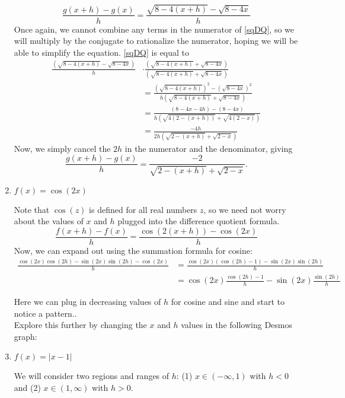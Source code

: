\documentclass{ximera}
\begin{document}
\begin{example}
\begin{enumerate}
\begin{explanation}
  \begin{equation}\label{sqDQ}
   \frac{g(x+h) - g(x)}{h} = \frac{\sqrt{8-4(x+h)} - \sqrt{8-4x}}{h}
  \end{equation}
  Once again, we cannot combine any terms in the numerator of \eqref{sqDQ}, so we will multiply by the conjugate to rationalize the numerator, hoping we will be able to simplify the equation. \eqref{sqDQ} is equal to
  \begin{align*}
 \frac{(\sqrt{8-4(x+h)} - \sqrt{8-4x})}{h} &\cdot \frac{(\sqrt{8-4(x+h)} + \sqrt{8-4x})}{(\sqrt{8-4(x+h)} + \sqrt{8-4x})} \\
  &=  \frac{(\sqrt{8-4(x+h)})^2 - (\sqrt{8-4x})^2}{h(\sqrt{8-4(x+h)} + \sqrt{8-4x})} \\
  &= \frac{(8-4x-4h) - (8-4x)}{h(\sqrt{4(2-(x+h))} + \sqrt{4(2-x)})}\\
  &= \frac{-4h}{2h(\sqrt{2-(x+h)} + \sqrt{2-x})}
  \end{align*}
  Now, we simply cancel the $2h$ in the numerator and the denominator, giving
  $$ \frac{g(x+h) - g(x)}{h} = \frac{-2}{\sqrt{2-(x+h)} + \sqrt{2-x}}.$$
  \end{explanation}
  \item $f(x) = \cos(2x)$
 \\
 \begin{explanation}
 Note that $\cos(z)$ is defined for all real numbers $z$, so we need not worry about the values of $x$ and $h$ plugged into the difference quotient formula.
 \begin{equation*}\label{cosDQ}
 \frac{f(x+h) - f(x)}{h} = \frac{\cos(2(x+h)) - \cos(2x)}{h}
 \end{equation*}
 Now, we can expand out using the summation formula for cosine:
 \begin{align*}
 \frac{\cos(2x)\cos(2h)-\sin(2x)\sin(2h) - \cos(2x)}{h} 
 &= \frac{\cos(2x)(\cos(2h)-1)- \sin(2x)\sin(2h)}{h} \\
 &=  \cos(2x)\frac{\cos(2h)-1}{h}- \sin(2x)\frac{\sin(2h)}{h}
 \end{align*}
 
Here we can plug in decreasing values of $h$ for cosine and sine and start to notice a pattern..\\
Explore this further by changing the $x$ and $h$ values in the following Desmos graph:
 \end{explanation}
  \item $f(x) = |x-1|$ %
  \\
   \begin{explanation}
   We will consider two regions and ranges of $h$: (1) $x \in (-\infty,1)$ with $h<0$ and (2) $x\in(1, \infty)$ with $h>0$. 
   

\end{explanation}
\end{enumerate}
\end{example}
\end{document}
